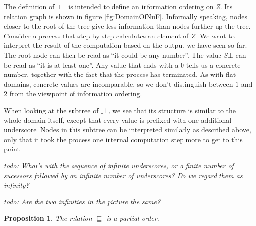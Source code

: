 \documentclass[a4paper]{article}
\newcommand{\todo}[1]{\bigskip \noindent \emph{todo: #1}}
\newtheorem{thmPONuFisPartial}[defNuF]{Proposition}
\begin{document}
The definition of $\sqsubseteq$ is intended to define an information ordering on
$Z$.  Its relation graph is shown in figure \ref{fig:DomainOfNuF}.
Informally speaking, nodes closer to the root of the tree give less information
than nodes further up the tree.  Consider a process that step-by-step calculates
an element of $Z$.  We want to interpret the result of the computation
based on the output we have seen so far.  The root node can then be read as ``it
could be any number''.  The value $S\bot$ can be read as ``it is at least one''.
Any value that ends with a $0$ tells us a concrete number, together with the
fact that the process has terminated.  As with flat domains, concrete values are
incomparable, so we don't distinguish between $1$ and $2$ from the viewpoint of
information ordering.

When looking at the subtree of $\_\bot$, we see that its structure is similar
to the whole domain itself, except that every value is prefixed with one additional
underscore.  Nodes in this subtree can be interpreted similarly as described
above, only that it took the process one internal computation step more to
get to this point.

\todo{What's with the sequence of infinite underscores, or a finite number of
sucessors followed by an infinite number of underscores?  Do we regard them as
infinity?}

\todo{Are the two infinities in the picture the same?}

\begin{thmPONuFisPartial}

The relation $\sqsubseteq$ is a partial order.

\end{thmPONuFisPartial}
\end{document}
